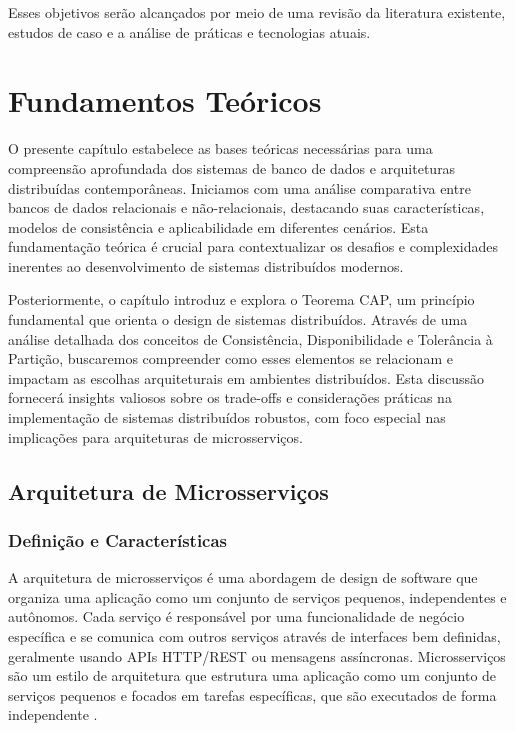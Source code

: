 Esses objetivos serão alcançados por meio de uma revisão da literatura existente, estudos de caso e a análise de práticas e tecnologias atuais.


\chapter{Fundamentos Teóricos}

O presente capítulo estabelece as bases teóricas necessárias para uma compreensão aprofundada dos sistemas de banco de dados e arquiteturas distribuídas contemporâneas. Iniciamos com uma análise comparativa entre bancos de dados relacionais e não-relacionais, destacando suas características, modelos de consistência e aplicabilidade em diferentes cenários. Esta fundamentação teórica é crucial para contextualizar os desafios e complexidades inerentes ao desenvolvimento de sistemas distribuídos modernos.

Posteriormente, o capítulo introduz e explora o Teorema CAP, um princípio fundamental que orienta o design de sistemas distribuídos. Através de uma análise detalhada dos conceitos de Consistência, Disponibilidade e Tolerância à Partição, buscaremos compreender como esses elementos se relacionam e impactam as escolhas arquiteturais em ambientes distribuídos. Esta discussão fornecerá insights valiosos sobre os trade-offs e considerações práticas na implementação de sistemas distribuídos robustos, com foco especial nas implicações para arquiteturas de microsserviços.

\section{Arquitetura de Microsserviços}

\subsection{Definição e Características}

A arquitetura de microsserviços é uma abordagem de design de software que organiza uma aplicação como um conjunto de serviços pequenos, independentes e autônomos. Cada serviço é responsável por uma funcionalidade de negócio específica e se comunica com outros serviços através de interfaces bem definidas, geralmente usando APIs HTTP/REST ou mensagens assíncronas. Microsserviços são um estilo de arquitetura que estrutura uma aplicação como um conjunto de serviços pequenos e focados em tarefas específicas, que são executados de forma independente \cite{newman2019}.

